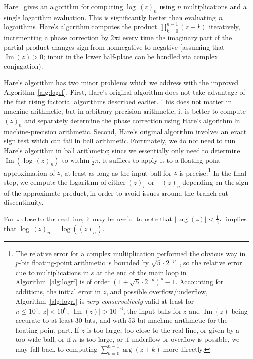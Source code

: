 \documentclass[reqno]{amsart}
\newcommand{\Imag}{\operatorname{Im}}
\theoremstyle{definition}
\begin{document}
Hare~\cite{Hare1997} gives an algorithm for
computing $\log \, (z)_n$ using $n$ multiplications and a single logarithm
evaluation. This is significantly better than evaluating~$n$ logarithms.
Hare's algorithm computes the product $\prod_{k=0}^{n-1} (z+k)$ iteratively,
incrementing a phase correction by $2 \pi i$ every time the
imaginary part of the partial product changes sign from nonnegative to negative (assuming that $\operatorname{Im}(z) > 0$;
input in the lower half-plane can be handled via complex conjugation).

Hare's algorithm has two minor problems
which we address with the improved Algorithm~\ref{alg:logrf}.
First, Hare's original algorithm does not take advantage of the fast rising factorial
algorithms described earlier.
This does not matter in machine arithmetic,
but in arbitrary-precision arithmetic, it is better to compute
$(z)_n$ and separately determine the phase correction using Hare's algorithm
in machine-precision arithmetic.
Second, Hare's original algorithm involves an exact sign test which can fail in ball arithmetic.
Fortunately, we do not need to run Hare's algorithm in ball arithmetic;
since we essentially only need to determine $\operatorname{Im}(\log \, (z)_n)$ to within $\tfrac{1}{2} \pi$,
it suffices to apply it to a floating-point approximation of $z$,
at least as long as the input ball for $z$ is precise.\footnote{The relative error for a complex
multiplication performed the obvious way in $p$-bit floating-point arithmetic
is bounded by $\sqrt{5} \cdot 2^{-p}$~\cite{brent2007error}, so the
relative error due to multiplications in $s$ at the end of the main loop in Algorithm~\ref{alg:logrf}
is of order $(1 + \sqrt{5} \cdot 2^{-p})^n - 1$. Accounting for additions,
the initial error in $z$, and possible overflow/underflow, Algorithm~\ref{alg:logrf} is
\emph{very conservatively} valid at least for $n \le 10^6, |z| < 10^6, |\Imag(z)| > 10^{-6}$,
the input balls for $z$ and $\Imag(z)$ being accurate to at least 30 bits,
and with 53-bit machine arithmetic for the floating-point part.
If $z$ is too large, too close to the real line, or given by a too wide ball,
or if $n$ is too large, or if underflow or overflow is possible,
we may fall back to
computing $\sum_{k=0}^{n-1} \arg(z+k)$ more directly.}
In the final step, we compute the logarithm of either $(z)_n$ or $-(z)_n$
depending on the sign of the approximate product, in order to avoid
issues around the branch cut discontinuity.

For $z$ close to the real line, it may be useful to note
that $|\arg(z)| < \tfrac{1}{n} \pi$ implies that $\log \, (z)_n = \log((z)_n)$.
\end{document}
